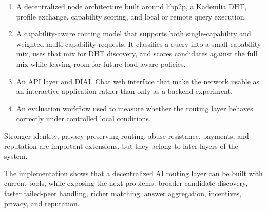 \begin{enumerate}
  \item A decentralized node architecture built around libp2p, a Kademlia
  DHT, profile exchange, capability scoring, and local or remote query
  execution.
  \item A capability-aware routing model that supports both single-capability
  and weighted multi-capability requests. It classifies a query into a small
  capability mix, uses that mix for DHT discovery, and scores candidates
  against the full mix while leaving room for future load-aware policies.
  \item An API layer and DIAL Chat web interface that make the network usable
  as an interactive application rather than only as a backend experiment.
  \item An evaluation workflow used to measure whether the routing layer behaves
  correctly under controlled local conditions.
\end{enumerate}

Stronger identity, privacy-preserving routing, abuse resistance, payments, and
reputation are important extensions, but they belong to later layers of the
system.

The implementation shows that a decentralized AI routing layer can be built
with current tools, while exposing the next problems: broader candidate
discovery, faster failed-peer handling, richer matching, answer aggregation,
incentives, privacy, and reputation.
